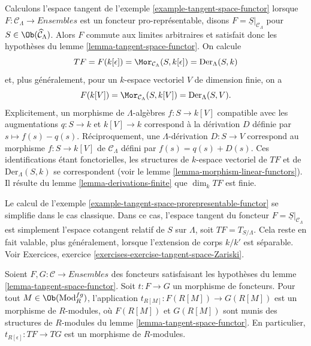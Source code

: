 \begin{example}
\label{example-tangent-space-prorepresentable-functor}
Calculons l'espace tangent de l'exemple
\ref{example-tangent-space-functor} lorsque
$F : \mathcal{C}_\Lambda \to \textit{Ensembles}$ est un foncteur
pro-représentable, disons $F = \underline{S}|_{\mathcal{C}_\Lambda}$ pour
$S \in \Ob(\widehat{\mathcal{C}}_\Lambda)$. Alors $F$ commute aux limites
arbitraires et satisfait donc les hypothèses du lemme
\ref{lemma-tangent-space-functor}. On calcule
$$
TF = F(k[\epsilon]) = \Mor_{\mathcal{C}_\Lambda}(S, k[\epsilon])
= \text{Der}_\Lambda(S, k)
$$
et, plus généralement, pour un $k$-espace vectoriel $V$ de dimension finie,
on a
$$
F(k[V]) = \Mor_{\mathcal{C}_\Lambda}(S, k[V]) = \text{Der}_\Lambda(S, V).
$$
Explicitement, un morphisme de $\Lambda$-algèbres $f : S \to k[V]$
compatible avec les augmentations $q : S \to k$ et $k[V] \to k$ correspond
à la dérivation $D$ définie par $s \mapsto f(s) - q(s)$. Réciproquement, une
$\Lambda$-dérivation $D : S \to V$ correspond au morphisme
$f : S \to k[V]$ de $\mathcal{C}_\Lambda$ défini par
$f(s) = q(s) + D(s)$. Ces identifications étant fonctorielles, les structures
de $k$-espace vectoriel de $TF$ et de $\text{Der}_\Lambda(S, k)$ se
correspondent (voir le lemme \ref{lemma-morphism-linear-functors}). Il résulte
du lemme \ref{lemma-derivations-finite} que $\dim_k TF$ est finie.
\end{example}

\begin{example}
\label{example-tangent-space-classical-prorepresentable-functor}
Le calcul de l'exemple
\ref{example-tangent-space-prorepresentable-functor} se simplifie dans le cas
classique. Dans ce cas, l'espace tangent du foncteur
$F = \underline{S}|_{\mathcal{C}_\Lambda}$ est simplement l'espace cotangent
relatif de $S$ sur $\Lambda$, soit $TF = T_{S/\Lambda}$. Cela reste en fait
valable, plus généralement, lorsque l'extension de corps $k/k'$ est
séparable. Voir Exercices, exercice
\ref{exercises-exercise-tangent-space-Zariski}.
\end{example}

\begin{lemma}
\label{lemma-morphism-tangent-spaces}
Soient $F, G: \mathcal{C} \to \textit{Ensembles}$ des foncteurs satisfaisant les
hypothèses du lemme \ref{lemma-tangent-space-functor}. Soit $t : F \to G$ un
morphisme de foncteurs. Pour tout $M \in \Ob(\text{Mod}^{fg}_R)$,
l'application $t_{R[M]}: F(R[M]) \to G(R[M])$ est un morphisme de
$R$-modules, où $F(R[M])$ et $G(R[M])$ sont munis des structures de
$R$-modules du lemme \ref{lemma-tangent-space-functor}. En particulier,
$t_{R[\epsilon]} : TF \to TG$ est un morphisme de $R$-modules.
\end{lemma}

